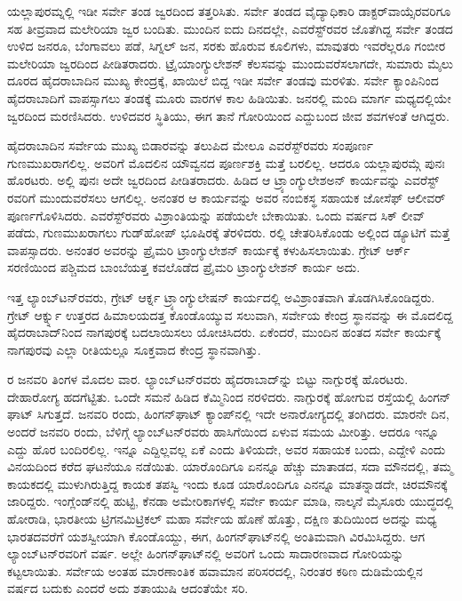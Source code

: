 ಯಲ್ಲಾಪುರಮ್ನಲ್ಲಿ ಇಡೀ ಸರ್ವೇ ತಂಡ ಜ್ವರದಿಂದ ತತ್ತರಿಸಿತು. ಸರ್ವೇ ತಂಡದ ವೈದ್ಯಾಧಿಕಾರಿ ಡಾಕ್ಟರ್​ ವಾಯ್ಸೆರವರಿಗೂ ಸಹ ತೀವ್ರವಾದ ಮಲೇರಿಯಾ ಜ್ವರ ಬಂದಿತು. ಮುಂದಿನ ಐದು ದಿನದಲ್ಲೇ, ಎವರೆಸ್ಟ್​ರವರ ಜೊತೆಗಿದ್ದ ಸರ್ವೇ ತಂಡದ ಉಳಿದ  ಜನರೂ, ಬೆಂಗಾವಲು ಪಡೆ, ಸಿಗ್ನಲ್​ ಜನ, ಸರಕು ಹೊರುವ ಕೂಲಿಗಳು, ಮಾವುತರು ಇವರೆಲ್ಲರೂ ಗಂಬೀರ ಮಲೇರಿಯಾ ಜ್ವರದಿಂದ ಪೀಡಿತರಾದರು. ಟ್ರೈಯಾಂಗ್ಯುಲೇಶನ್​ ಕೆಲಸವನ್ನು ಮುಂದುವರೆಸಲಾಗದೇ, ಸುಮಾರು  ಮೈಲು ದೂರದ ಹೈದರಾಬಾದಿನ ಮುಖ್ಯ ಕೇಂದ್ರಕ್ಕೆ, ಖಾಯಿಲೆ ಬಿದ್ದ ಇಡೀ ಸರ್ವೇ ತಂಡವು ಮರಳಿತು. ಸರ್ವೇ ಕ್ಯಾಂಪಿನಿಂದ ಹೈದರಾಬಾದಿಗೆ ವಾಪಸ್ಸಾಗಲು ತಂಡಕ್ಕೆ ಮೂರು ವಾರಗಳ ಕಾಲ ಹಿಡಿಯಿತು.  ಜನರಲ್ಲಿ  ಮಂದಿ ಮಾರ್ಗ ಮಧ್ಯದಲ್ಲಿಯೇ ಜ್ವರದಿಂದ ಮರಣಿಸಿದರು. ಉಳಿದವರ ಸ್ಥಿತಿಯು, ಈಗ ತಾನೆ ಗೋರಿಯಿಂದ ಎದ್ದುಬಂದ ಜೀವ ಶವಗಳಂತೆ ಆಗಿದ್ದರು.

ಹೈದರಾಬಾದಿನ ಸರ್ವೇಯ ಮುಖ್ಯ ಬಿಡಾರವನ್ನು ತಲುಪಿದ ಮೇಲೂ ಎವರೆಸ್ಟ್​ರವರು ಸಂಪೂರ್ಣ ಗುಣಮುಖರಾಗಲಿಲ್ಲ. ಅವರಿಗೆ ಮೊದಲಿನ ಯೌವ್ವನದ ಪೂರ್ಣಶಕ್ತಿ ಮತ್ತೆ ಬರಲಿಲ್ಲ. ಆದರೂ ಯಲ್ಲಾಪುರಮ್ಗೆ ಪುನಃ ಹೊರಟರು. ಅಲ್ಲಿ ಪುನಃ ಅದೇ ಜ್ವರದಿಂದ ಪೀಡಿತರಾದರು. ಹಿಡಿದ ಆ ಟ್ರ್ಯಾಂಗ್ಯುಲೇಶಅನ್​ ಕಾರ್ಯವನ್ನು ಎವರೆಸ್ಟ್​ರವರಿಗೆ ಮುಂದುವರೆಸಲು ಆಗಲಿಲ್ಲ. ಅನಂತರ ಆ ಕಾರ್ಯವನ್ನು ಅವರ ನಂಬಿಕಸ್ಥ ಸಹಾಯಕ ಜೋಸೆಫ್​ ಆಲೀವರ್​ ಪೂರ್ಣಗೊಳಿಸಿದರು. ಎವರೆಸ್ಟ್​ರವರು ವಿಶ್ರಾಂತಿಯನ್ನು ಪಡೆಯಲೇ ಬೇಕಾಯಿತು. ಒಂದು ವರ್ಷದ ಸಿಕ್​ ಲೀವ್​ ಪಡೆದು, ಗುಣಮುಖರಾಗಲು ಗುಡ್​ಹೋಪ್​ ಭೂಷಿರಕ್ಕೆ ತೆರಳಿದರು. ರಲ್ಲಿ ಚೇತರಿಸಿಕೊಂಡು ಅಲ್ಲಿಂದ ಡ್ಯೂಟಿಗೆ ಮತ್ತೆ ವಾಪಸ್ಸಾದರು. ಅನಂತರ ಅವರನ್ನು ಪ್ರೈಮರಿ ಟ್ರಾಂಗ್ಯುಲೇಶನ್​ ಕಾರ್ಯಕ್ಕೆ ಕಳುಹಿಸಲಾಯಿತು. ಗ್ರೇಟ್​ ಆರ್ಕ್ ಸರಣಿಯಿಂದ ಪಶ್ಚಿಮದ ಬಾಂಬೆಯತ್ತ ಕವಲೊಡೆದ ಪ್ರೈಮರಿ ಟ್ರಾಂಗ್ಯುಲೇಶನ್​ ಕಾರ್ಯ ಅದು.

ಇತ್ತ ಲ್ಯಾಂಬ್​ಟನ್​ರವರು, ಗ್ರೇಟ್​ ಆರ್ಕ್ನ ಟ್ರ್ಯಾಂಗ್ಯುಲೇಷನ್​ ಕಾರ್ಯದಲ್ಲಿ ಅವಿಶ್ರಾಂತವಾಗಿ ತೊಡಗಿಸಿಕೊಂಡಿದ್ದರು. ಗ್ರೇಟ್​ ಆರ್ಕ್ನ್ನು ಉತ್ತರದ ಹಿಮಾಲಯದತ್ತ ಕೊಂಡೊಯ್ಯುವ ಸಲುವಾಗಿ, ಸರ್ವೇಯ ಕೇಂದ್ರ ಸ್ಥಾನವನ್ನು ಈ ಮೊದಲಿದ್ದ ಹೈದರಾಬಾದ್​ನಿಂದ ನಾಗಪುರಕ್ಕೆ ಬದಲಾಯಿಸಲು ಯೋಚಿಸಿದರು. ಏಕೆಂದರೆ, ಮುಂದಿನ ಹಂತದ ಸರ್ವೇ ಕಾರ್ಯಕ್ಕೆ ನಾಗಪುರವು ಎಲ್ಲಾ ರೀತಿಯಲ್ಲೂ ಸೂಕ್ತವಾದ ಕೇಂದ್ರ ಸ್ಥಾನವಾಗಿತ್ತು.

ರ ಜನವರಿ ತಿಂಗಳ ಮೊದಲ ವಾರ. ಲ್ಯಾಂಬ್​ಟನ್​ರವರು ಹೈದರಾಬಾದ್​ನ್ನು ಬಿಟ್ಟು ನಾಗ್ಪುರಕ್ಕೆ ಹೊರಟರು. ದೇಹಾರೋಗ್ಯ ಹದಗೆಟ್ಟಿತು. ಒಂದೇ ಸಮನೆ ಹಿಡಿದ ಕೆಮ್ಮಿನಿಂದ ನರಳಿದರು. ನಾಗ್ಪುರಕ್ಕೆ ಹೋಗುವ ರಸ್ತೆಯಲ್ಲಿ ಹಿಂಗನ್​ ಘಾಟ್​ ಸಿಗುತ್ತದೆ. ಜನವರಿ  ರಂದು, ಹಿಂಗನ್​ಘಾಟ್​ ಕ್ಯಾಂಪ್​ನಲ್ಲಿ ಇದೇ ಅನಾರೋಗ್ಯದಲ್ಲಿ ತಂಗಿದರು. ಮಾರನೇ ದಿನ, ಅಂದರೆ  ಜನವರಿ  ರಂದು, ಬೆಳಿಗ್ಗೆ ಲ್ಯಾಂಬ್​ಟನ್​ರವರು ಹಾಸಿಗೆಯಿಂದ ಏಳುವ ಸಮಯ ಮೀರಿತ್ತು. ಆದರೂ ಇನ್ನೂ ಎದ್ದು ಹೊರ ಬಂದಿರಲಿಲ್ಲ. ಇನ್ನೂ ಎದ್ದಿಲ್ಲವಲ್ಲ ಏಕೆ ಎಂದು ತಿಳಿಯದೇ, ಅವರ ಸಹಾಯಕ ಬಂದು, ಎದ್ದೇಳಿ ಎಂದು ವಿನಯದಿಂದ ಕರೆದ ಘಟನೆಯೂ ನಡೆಯಿತು. ಯಾರೊಂದಿಗೂ ಏನನ್ನೂ ಹೆಚ್ಚು ಮಾತಾಡದ, ಸದಾ ಮೌನದಲ್ಲಿ, ತಮ್ಮ ಕಾಯಕದಲ್ಲಿ ಮುಳುಗಿರುತ್ತಿದ್ದ ಕಾಯಕ ತಪಸ್ವಿ ಇಂದು ಕೂಡ ಯಾರೊಂದಿಗೂ ಎನನ್ನೂ ಮಾತನ್ನಾಡದೇ, ಚಿರಮೌನಕ್ಕೆ ಜಾರಿದ್ದರು. ಇಂಗ್ಲೆಂಡ್​ನಲ್ಲಿ ಹುಟ್ಟಿ, ಕೆನಡಾ ಅಮೇರಿಕಾಗಳಲ್ಲಿ ಸರ್ವೇ ಕಾರ್ಯ ಮಾಡಿ, ನಾಲ್ಕನೆ ಮೈಸೂರು ಯುದ್ಧದಲ್ಲಿ ಹೋರಾಡಿ, ಭಾರತೀಯ ಟ್ರಿಗನಮಿಟ್ರಿಕಲ್​ ಮಹಾ ಸರ್ವೇಯ ಹೊಣೆ ಹೊತ್ತು, ದಕ್ಷಿಣ ತುದಿಯಿಂದ ಅದನ್ನು ಮಧ್ಯ ಭಾರತದವರೆಗೆ ಯಶಸ್ವೀಯಾಗಿ ಕೊಂಡೊಯ್ದು, ಈಗ, ಹಿಂಗನ್​ಘಾಟ್​ನಲ್ಲಿ ಅಂತಿಮವಾಗಿ ವಿರಮಿಸಿದ್ದರು. ಆಗ ಲ್ಯಾಂಬ್​ಟನ್​ರವರಿಗೆ  ವರ್ಷ. ಅಲ್ಲೇ ಹಿಂಗನ್​ಘಾಟ್​ನಲ್ಲಿ ಅವರಿಗೆ ಒಂದು ಸಾದಾರಣವಾದ ಗೋರಿಯನ್ನು ಕಟ್ಟಲಾಯಿತು. ಸರ್ವೇಯ ಅಂತಹ ಮಾರಣಾಂತಿಕ ಹವಾಮಾನ ಪರಿಸರದಲ್ಲಿ, ನಿರಂತರ ಕಠಿಣ ದುಡಿಮೆಯಲ್ಲಿನ  ವರ್ಷದ ಬದುಕು ಎಂದರೆ ಅದು ಶತಾಯುಷಿ ಆದಂತೆಯೇ ಸರಿ.

